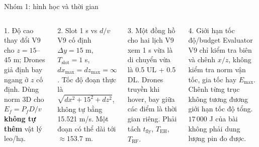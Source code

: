 \documentclass[t,aspectratio=169]{beamer}
\begin{document}
\begin{frame}{Nhóm 1: hình học và thời gian}
  \begin{columns}[T]
  \begin{block}{1. Độ cao thay đổi}\scriptsize
  V9 cho $z=15$--$45$ m; Drones giả định bay ngang ở $z$ cố định. Dùng norm 3D cho $E_f=P_fD/v$ \textbf{không tự thêm} vật lý leo/hạ.
  \end{block}
  \begin{block}{2. Slot 1 s vs $d/v$}\scriptsize
  V9 cố định $\Delta y=15$ m, $T_{\mathrm{slot}}=1$ s, $dx_{\max}=dz_{\max}=\infty$. Tốc độ đoạn thực là $\sqrt{dx^2+15^2+dz^2}$, không tự bằng 15.521 m/s. Một đoạn có thể dài tới $\approx153.7$ m.
  \end{block}
  \begin{block}{3. Một đồng hồ cho hai lịch}\scriptsize
  V9 xem 1 s vừa là di chuyển vừa là 0.5 UL + 0.5 DL. Drones truyền khi hover, bay giữa các điểm là thời gian riêng. Phải tách $t_{\mathrm{fly}}$, $T_{\mathrm{EH}}$, $T_{\mathrm{RF}}$.
  \end{block}
  \begin{alertblock}{4. Giới hạn tốc độ/budget}\scriptsize
  Evaluator V9 chỉ kiểm tra biên và chênh $x/z$, không kiểm tra norm vận tốc, gia tốc hay $E_{\max}$. Chênh từng trục không tương đương giới hạn tốc độ tổng. $17\,000$ J của bài không phải dung lượng pin đo được.
  \end{alertblock}
  \end{columns}
\end{frame}
\end{document}
